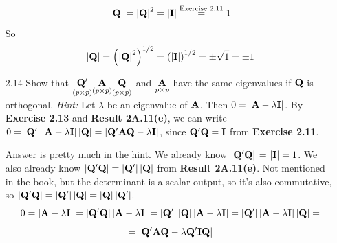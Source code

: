 \begin{enumerate}[font=\bfseries]
\[            \left|\bold{Q}\right|
            =
            \left|\bold{Q}\right|^2
            =
            \left|\bold{I}\right|
            \overset{\text{Exercise 2.11}}{=}
            1
        \]
        So
        \[
            \left|\bold{Q}\right|
            =
            {\left(\left|\bold{Q}\right|^2\right)}^{1/2}
            =
            {\left(\left|\bold{I}\right|\right)}^{1/2}
            =
            \pm\sqrt{1}
            =
            \pm 1
        \]
        \item[2.14] Show that $\underset{\left(p \times p\right)}{\bold{Q}^\prime} \underset{\left(p \times p\right)}{\bold{A}} \underset{\left(p \times p\right)}{\bold{Q}}$ and $\underset{p \times p}{\bold{A}}$ have the same eigenvalues if $\bold{Q}$ is orthogonal.
        \newline
        \textit{Hint:} Let $\lambda$ be an eigenvalue of $\bold{A}$. Then $0 = \left|\bold{A} - \lambda \bold{I}\right|$. By \textbf{Exercise 2.13} and \textbf{Result 2A.11(e)}, we can write $0 = \left|\bold{Q}^\prime\right|\left|\bold{A} - \lambda \bold{I}\right| \left|\bold{Q}\right| = \left|\bold{Q}^\prime \bold{A} \bold{Q} - \lambda\bold{I}\right|$, since $\bold{Q}^\prime \bold{Q} = \bold{I}$ from \textbf{Exercise 2.11}.
        \par
        Answer is pretty much in the hint. We already know $\left|\bold{Q}^\prime\bold{Q}\right|$ = $\left|\bold{I}\right| = 1$. We also already know $\left|\bold{Q}^\prime\bold{Q}\right| = \left|\bold{Q}^\prime\right|\left|\bold{Q}\right|$ from \textbf{Result 2A.11(e)}. Not mentioned in the book, but the determinant is a scalar output, so it's also commutative, so $\left|\bold{Q}^\prime\bold{Q}\right| = \left|\bold{Q}^\prime\right|\left|\bold{Q}\right| = \left|\bold{Q}\right|\left|\bold{Q}^\prime\right|$.
        \[
            0
            =
            \left|\bold{A} - \lambda \bold{I}\right|
            =
            \left|\bold{Q}^\prime\bold{Q}\right|
            \left|\bold{A} - \lambda \bold{I}\right|
            =
            \left|\bold{Q}^\prime\right|
            \left|\bold{Q}\right|
            \left|\bold{A} - \lambda \bold{I}\right|
            =
            \left|\bold{Q}^\prime\right|
            \left|\bold{A} - \lambda \bold{I}\right|
            \left|\bold{Q}\right|
            =
        \]
        \[
            =
            \left|\bold{Q}^\prime\bold{A}\bold{Q} - \lambda \bold{Q}^\prime\bold{I}\bold{Q}\right|
\]
\end{enumerate}
